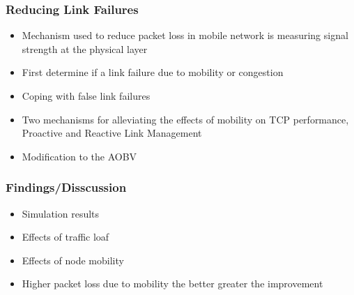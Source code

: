 \begin{frame}[t]
  \frametitle{Reducing Link Failures}
  \begin{itemize}
  \item Mechanism used to reduce packet loss in mobile network is measuring signal strength at the physical layer
  \item First determine if a link failure due to mobility or congestion
  \item Coping with false link failures
  \item Two mechanisms for alleviating the effects of mobility on TCP performance, Proactive and Reactive Link Management
  \item Modification to the AOBV
  \end{itemize}

  \vfill

  \begin{flushleft}
    \begin{tiny}
      \begin{minipage}{1.0\linewidth}
      \end{minipage}
    \end{tiny}
  \end{flushleft}
  
\end{frame}

\begin{frame}[t]
  \frametitle{Findings/Disscussion}
  \begin{itemize}
  \item Simulation results
  \item Effects of traffic loaf
  \item Effects of node mobility
  \item Higher packet loss due to mobility the better greater the improvement
  \end{itemize}

  \vfill

  \begin{flushleft}
    \begin{tiny}
      \begin{minipage}{1.0\linewidth}
      \end{minipage}
    \end{tiny}
  \end{flushleft}

\end{frame}

